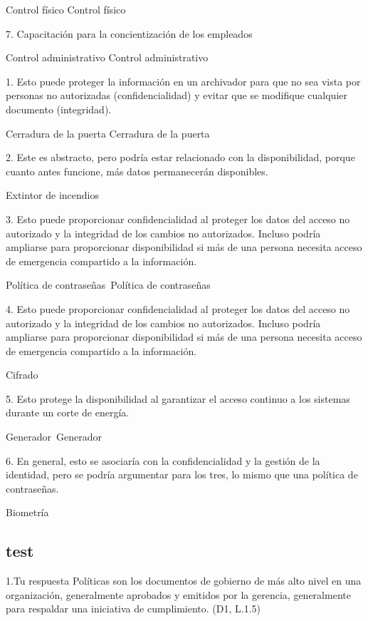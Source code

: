 Control físico
   Control físico

7. Capacitación para la concientización de los empleados


Control administrativo
    Control administrativo


1. Esto puede proteger la información en un archivador para que no sea vista por personas no autorizadas (confidencialidad) y evitar que se modifique cualquier documento (integridad).


Cerradura de la puerta
   Cerradura de la puerta

2. Este es abstracto, pero podría estar relacionado con la disponibilidad, porque cuanto antes funcione, más datos permanecerán disponibles. 



   Extintor de incendios

3. Esto puede proporcionar confidencialidad al proteger los datos del acceso no autorizado y la integridad de los cambios no autorizados. Incluso podría ampliarse para proporcionar disponibilidad si más de una persona necesita acceso de emergencia compartido a la información. 


Política de contraseñas 
   Política de contraseñas

4. Esto puede proporcionar confidencialidad al proteger los datos del acceso no autorizado y la integridad de los cambios no autorizados. Incluso podría ampliarse para proporcionar disponibilidad si más de una persona necesita acceso de emergencia compartido a la información.



   Cifrado

5. Esto protege la disponibilidad al garantizar el acceso continuo a los sistemas durante un corte de energía.


Generador 
   Generador

6. En general, esto se asociaría con la confidencialidad y la gestión de la identidad, pero se podría argumentar para los tres, lo mismo que una política de contraseñas. 



   Biometría

   \subsection{test}
1.Tu respuesta
Políticas
son los documentos de gobierno de más alto nivel en una organización, generalmente aprobados y emitidos por la gerencia, generalmente para respaldar una iniciativa de cumplimiento. (D1, L.1.5)

